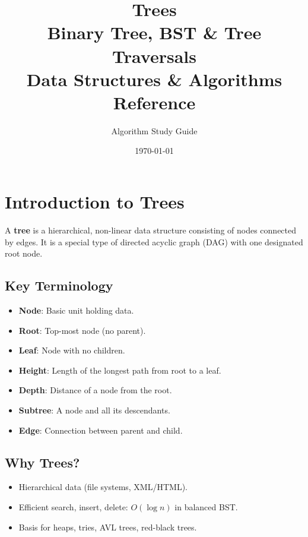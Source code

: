 \documentclass[12pt,a4paper]{article}
\title{
    \Huge \textbf{Trees} \\[0.5em]
    \Large Binary Tree, BST \& Tree Traversals \\[0.5em]
    \large Data Structures \& Algorithms Reference
}
\author{Algorithm Study Guide}
\date{\today}
\begin{document}
\maketitle
\tableofcontents
\newpage

\section{Introduction to Trees}

A \textbf{tree} is a hierarchical, non-linear data structure consisting of nodes connected by edges. It is a special type of directed acyclic graph (DAG) with one designated root node.

\subsection{Key Terminology}
\begin{itemize}
    \item \textbf{Node}: Basic unit holding data.
    \item \textbf{Root}: Top-most node (no parent).
    \item \textbf{Leaf}: Node with no children.
    \item \textbf{Height}: Length of the longest path from root to a leaf.
    \item \textbf{Depth}: Distance of a node from the root.
    \item \textbf{Subtree}: A node and all its descendants.
    \item \textbf{Edge}: Connection between parent and child.
\end{itemize}

\subsection{Why Trees?}
\begin{itemize}
    \item Hierarchical data (file systems, XML/HTML).
    \item Efficient search, insert, delete: $O(\log n)$ in balanced BST.
    \item Basis for heaps, tries, AVL trees, red-black trees.
\end{itemize}

\newpage

\end{document}
